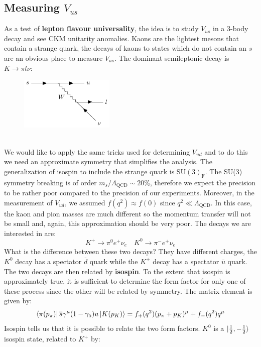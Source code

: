 \documentclass[../main.tex]{subfiles}
\begin{document}
\subsection{Measuring $V_{us}$}
As a test of \textbf{lepton flavour universality}, the idea is to study $V_{us}$ in a 3-body decay and see CKM unitarity anomalies. Kaons are the lightest mesons that contain a strange quark, the decays of kaons to states which do not contain an $s$ are an obvious place to measure $V_{us}$. The dominant semileptonic decay is $K\to\pi l\nu$:\\
\begin{figure}[h]
    \centering
    \includegraphics[width=0.4\textwidth]{Images/kaondecay.pdf}
    \caption*{}
\end{figure}\\
We would like to apply the same tricks used for determining $V_{ud}$ and to do this we need an approximate symmetry that simplifies the analysis. The generalization of isospin to include the strange quark is SU$(3)_{\text{F}}$. The SU(3) symmetry breaking is of order $m_s/\Lambda_{\text{QCD}}\sim20\%$, therefore we expect the precision to be rather poor compared to the precision of our experiments. Moreover, in the measurement of $V_{ud}$, we assumed $f(q^2)\approx f(0)$ since $q^2\ll\Lambda_{\text{QCD}}$. In this case, the kaon and pion masses are much different so the momentum transfer will not be small and, again, this approximation should be very poor. The decays we are interested in are:
\[
K^+\to\pi^0e^+\nu_e \quad K^0\to\pi^-e^+\nu_e
\]
What is the difference between these two decays? They have different charges, the $K^0$ decay has a spectator $\overline{d}$ quark while the $K^+$ decay has a spectator $\overline{u}$ quark. The two decays are then related by \textbf{isospin}. To the extent that isospin is approximately true, it is sufficient to determine the form factor for only one of these process since the other will be related by symmetry. The matrix element is given by:
\[
\bra{\pi(p_\pi)}\overline{s}\gamma^\mu(1-\gamma_5)u\ket{K(p_K)}=f_+(q^2)(p_\pi+p_K)^\mu+f_-(q^2)q^\mu
\]
Isospin tells us that it is possible to relate the two form factors. $K^0$ is a $\ket{\frac{1}{2},-\frac{1}{2}}$ isospin state, related to $K^+$ by:
\end{document}
